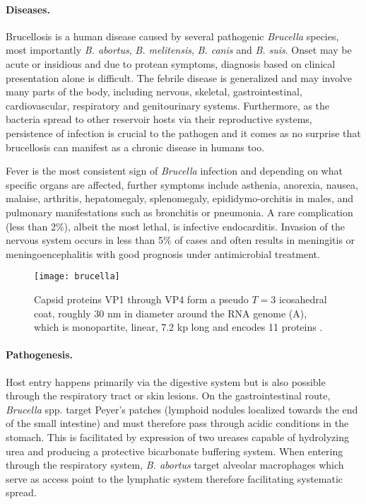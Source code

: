 \paragraph{Diseases.}
Brucellosis is a human disease caused by several pathogenic \textit{Brucella} species, most importantly \textit{B. abortus}, \textit{B. melitensis}, \textit{B. canis} and \textit{B. suis}. Onset may be acute or insidious and due to protean symptoms, diagnosis based on clinical presentation alone is difficult. The febrile disease is generalized and may involve many parts of the body, including nervous, skeletal, gastrointestinal, cardiovascular, respiratory and genitourinary systems. Furthermore, as the bacteria spread to other reservoir hosts via their reproductive systems, persistence of infection is crucial to the pathogen and it comes as no surprise that brucellosis can manifest as a chronic disease in humans too.

Fever is the most consistent sign of \textit{Brucella} infection and depending on what specific organs are affected, further symptoms include asthenia, anorexia, nausea, malaise, arthritis, hepatomegaly, splenomegaly, epididymo-orchitis in males, and pulmonary manifestations such as bronchitis or pneumonia. A rare complication (less than 2\%), albeit the most lethal, is infective endocarditis. Invasion of the nervous system occurs in less than 5\% of cases and often results in meningitis or meningoencephalitis with good prognosis under antimicrobial treatment.

\begin{figure}
  \centering
  \texttt{[image: brucella]}
  \caption[Replication cycle of \textit{Vaccinia viruses} for both intracellular mature and extracellular enveloped virions.]{Capsid proteins VP1 through VP4 form a pseudo $T=3$ icosahedral coat, roughly 30 nm in diameter around the RNA genome (A), which is monopartite, linear, 7.2 kp long and encodes 11 proteins \citep{Celli2015}.}
  \label{fig:brucella}
\end{figure}

\paragraph{Pathogenesis.}
Host entry happens primarily via the digestive system but is also possible through the respiratory tract or skin lesions. On the gastrointestinal route, \textit{Brucella} spp. target Peyer's patches (lymphoid nodules localized towards the end of the small intestine) and must therefore pass through acidic conditions in the stomach. This is facilitated by expression of two ureases capable of hydrolyzing urea and producing a protective bicarbonate buffering system. When entering through the respiratory system, \textit{B. abortus} target alveolar macrophages which serve as access point to the lymphatic system therefore facilitating systematic spread.

